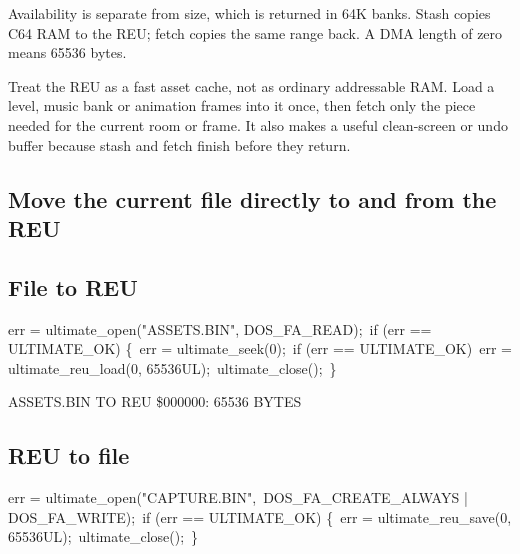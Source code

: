 Availability is separate from size, which is returned in 64K banks. Stash
copies C64 RAM to the REU; fetch copies the same range back. A DMA length of
zero means 65536 bytes.

\begin{tip}
Treat the REU as a fast asset cache, not as ordinary addressable RAM. Load a
level, music bank or animation frames into it once, then fetch only the piece
needed for the current room or frame. It also makes a useful clean-screen or
undo buffer because stash and fetch finish before they return.
\end{tip}

\subsection*{Move the current file directly to and from the REU}

\subsection*{File to REU}

\begin{listingbox}
err = ultimate\_open("ASSETS.BIN", DOS\_FA\_READ);\
if (err == ULTIMATE\_OK) \{\
\hspace*{1em}err = ultimate\_seek(0);\
\hspace*{1em}if (err == ULTIMATE\_OK)\
\hspace*{2em}err = ultimate\_reu\_load(0, 65536UL);\
\hspace*{1em}ultimate\_close();\
\}
\end{listingbox}

\begin{resultbox}
ASSETS.BIN TO REU \$000000: 65536 BYTES
\end{resultbox}

\subsection*{REU to file}

\begin{listingbox}
err = ultimate\_open("CAPTURE.BIN",\
\hspace*{2em}DOS\_FA\_CREATE\_ALWAYS | DOS\_FA\_WRITE);\
if (err == ULTIMATE\_OK) \{\
\hspace*{1em}err = ultimate\_reu\_save(0, 65536UL);\
\hspace*{1em}ultimate\_close();\
\}
\end{listingbox}


